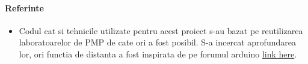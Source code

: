 
\paragraph{Referinte}
\begin{itemize}
\item
	\tab Codul cat si tehnicile utilizate pentru acest proiect s-au bazat pe reutilizarea laboratoarelor de PMP de cate ori a fost posibil. S-a incercat aprofundarea lor, ori functia de distanta  a fost inspirata de pe forumul arduino \href{https://www.arduino.cc/en/Tutorial/Ping}{link here}.
\end{itemize}
